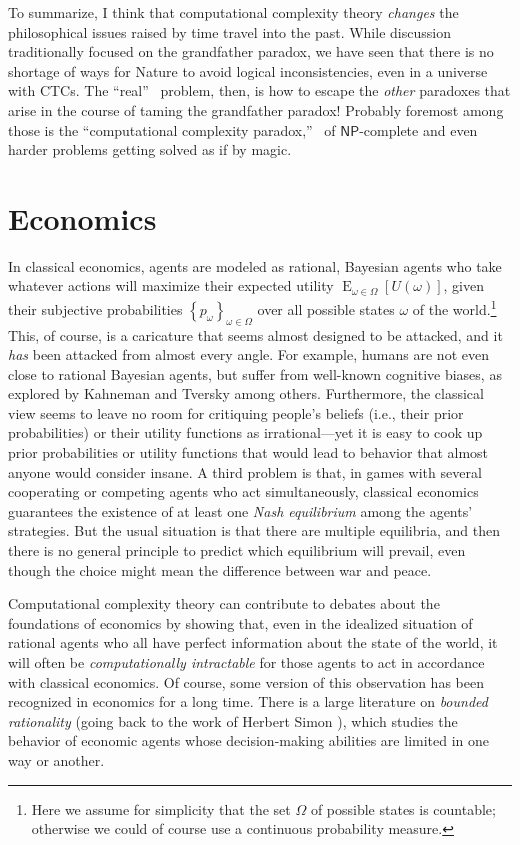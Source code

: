 \documentclass[12pt,onecolumn]{article}%
\begin{document}
To summarize, I think that computational complexity theory \textit{changes}
the philosophical issues raised by time travel into the past. While
discussion traditionally focused on the grandfather paradox, we have seen that
there is no shortage of ways for Nature to avoid logical inconsistencies, even
in a universe with CTCs. The \textquotedblleft real\textquotedblright\ %
 problem, then, is how to escape the \textit{other} paradoxes that arise in
the course of taming the grandfather paradox! Probably foremost among those
is the \textquotedblleft computational complexity paradox,\textquotedblright\ %
 of $\mathsf{NP}$-complete and even harder problems getting solved as if by magic.

\section{Economics\label{ECON}}

In classical economics, agents are modeled as rational, Bayesian agents who
take whatever actions will maximize their expected utility $\operatorname*{E}%
_{\omega\in\Omega}\left[  U\left(  \omega\right)  \right]  $, given their
subjective probabilities $\left\{  p_{\omega}\right\}  _{\omega\in\Omega}%
$ over all possible states $\omega$ of the world.\footnote{Here we assume
for simplicity that the set $\Omega$ of possible states is countable;
otherwise we could of course use a continuous probability measure.} This, of
course, is a caricature that seems almost designed to be attacked, and it
\textit{has} been attacked from almost every angle. For example, humans are
not even close to rational Bayesian agents, but suffer from well-known
cognitive biases, as explored by Kahneman and Tversky \cite{kahnemantversky}%
 among others. Furthermore, the classical view seems to leave no room for
critiquing people's beliefs (i.e., their prior probabilities) or their utility
functions as irrational---yet it is easy to cook up prior probabilities or
utility functions that would lead to behavior that almost anyone would
consider insane. A third problem is that, in games with several cooperating
or competing agents who act simultaneously, classical economics guarantees the
existence of at least one \textit{Nash equilibrium} among the agents'
strategies. But the usual situation is that there are multiple equilibria,
and then there is no general principle to predict which equilibrium will
prevail, even though the choice might mean the difference between war and peace.

Computational complexity theory can contribute to debates about the
foundations of economics by showing that, even in the idealized situation of
rational agents who all have perfect information about the state of the world,
it will often be \textit{computationally intractable} for those agents to act
in accordance with classical economics. Of course, some version of this
observation has been recognized in economics for a long time. There is a
large literature on \textit{bounded rationality} (going back to the work of
Herbert Simon \cite{herbsimon}), which studies the behavior of economic agents
whose decision-making abilities are limited in one way or another.
\end{document}
